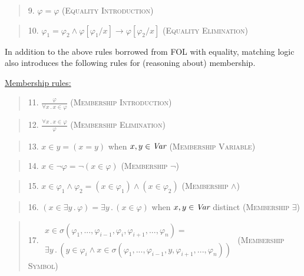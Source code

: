 \documentclass[UTF8,11pt]{article}
\theoremstyle{plain}
\theoremstyle{definition}
\theoremstyle{remark}
\newcommand{\ra}{\rightarrow}
\begin{document}
\begin{quote}
9. $\varphi = \varphi$
\hfill \textsc{(Equality Introduction)}
\end{quote}

\begin{quote}
10. $\varphi_1=\varphi_2 \mathrel\wedge \varphi[\varphi_1/x] \ra \varphi[\varphi_2/x]$
\hfill \textsc{(Equality Elimination)}
\end{quote}

In addition to the above rules borrowed from FOL with equality, matching
logic also introduces the following rules for (reasoning about) membership.

\vspace*{2ex}

\noindent
\underline{Membership rules:}

\begin{quote}
11. $\displaystyle\frac{\varphi}{\forall x\,.\,x\in\varphi}$
\hfill \textsc{(Membership Introduction)}
\end{quote}

\begin{quote}
12. $\displaystyle\frac{\forall x\,.\,x\in\varphi}{\varphi}$
\hfill \textsc{(Membership Elimination)}
\end{quote}

\begin{quote}
13. $x \in y = (x=y)$ when $x,y\in\textit{Var}$
\hfill \textsc{(Membership Variable)}
\end{quote}

\begin{quote}
14. $x\in\neg\varphi = \neg(x\in\varphi)$
\hfill \textsc{(Membership $\neg$)}
\end{quote}

\begin{quote}
15. $x\in\varphi_1\wedge\varphi_2 = (x\in\varphi_1) \wedge (x\in\varphi_2)$
\hfill \textsc{(Membership $\wedge$)}
\end{quote}

\begin{quote}
16. $(x\in\exists y\,.\,\varphi) = \exists y\,.\,(x\in\varphi)$ when $x,y\in\textit{Var}$ distinct
\hfill \textsc{(Membership $\exists$)}
\end{quote}

\begin{quote}
17. $\begin{array}{l}x\in\sigma(\varphi_1,...,\varphi_{i-1},\varphi_i,\varphi_{i+1},...,\varphi_n) = \\ \exists y\,.\, (y \in\varphi_i \mathrel\wedge x \in\sigma(\varphi_1,...,\varphi_{i-1},y,\varphi_{i+1},...,\varphi_n))\end{array}$
\hfill \textsc{(Membership Symbol)}
\end{quote}
\end{document}
